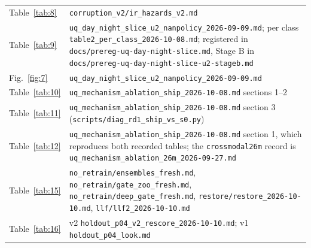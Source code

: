 \documentclass[journal,onecolumn]{IEEEtran}
\begin{document}
\begin{table}[htbp]
\begin{tabularx}{\linewidth}{l>{\raggedright\arraybackslash}X}
Table~\ref{tab:8} & \texttt{corruption\_\allowbreak{}v2/\allowbreak{}ir\_\allowbreak{}hazards\_\allowbreak{}v2.md} \\
Table~\ref{tab:9} & \texttt{uq\_\allowbreak{}day\_\allowbreak{}night\_\allowbreak{}slice\_\allowbreak{}u2\_\allowbreak{}nanpolicy\_\allowbreak{}2026-\allowbreak{}09-\allowbreak{}09.md}; per class \texttt{table2\_\allowbreak{}per\_\allowbreak{}class\_\allowbreak{}2026-\allowbreak{}10-\allowbreak{}08.md}; registered in \texttt{docs/\allowbreak{}prereg-\allowbreak{}uq-\allowbreak{}day-\allowbreak{}night-\allowbreak{}slice.md}, Stage B in \texttt{docs/\allowbreak{}prereg-\allowbreak{}uq-\allowbreak{}day-\allowbreak{}night-\allowbreak{}slice-\allowbreak{}u2-\allowbreak{}stageb.md} \\
Fig.~\ref{fig:7} & \texttt{uq\_\allowbreak{}day\_\allowbreak{}night\_\allowbreak{}slice\_\allowbreak{}u2\_\allowbreak{}nanpolicy\_\allowbreak{}2026-\allowbreak{}09-\allowbreak{}09.md} \\
Table~\ref{tab:10} & \texttt{uq\_\allowbreak{}mechanism\_\allowbreak{}ablation\_\allowbreak{}ship\_\allowbreak{}2026-\allowbreak{}10-\allowbreak{}08.md} sections 1--2 \\
Table~\ref{tab:11} & \texttt{uq\_\allowbreak{}mechanism\_\allowbreak{}ablation\_\allowbreak{}ship\_\allowbreak{}2026-\allowbreak{}10-\allowbreak{}08.md} section 3 (\texttt{scripts/\allowbreak{}diag\_\allowbreak{}rd1\_\allowbreak{}ship\_\allowbreak{}vs\_\allowbreak{}s0.py}) \\
Table~\ref{tab:12} & \texttt{uq\_\allowbreak{}mechanism\_\allowbreak{}ablation\_\allowbreak{}ship\_\allowbreak{}2026-\allowbreak{}10-\allowbreak{}08.md} section 1, which reproduces both recorded tables; the \texttt{crossmodal26m} record is \texttt{uq\_\allowbreak{}mechanism\_\allowbreak{}ablation\_\allowbreak{}26m\_\allowbreak{}2026-\allowbreak{}09-\allowbreak{}27.md} \\
Table~\ref{tab:15} & \texttt{no\_\allowbreak{}retrain/\allowbreak{}ensembles\_\allowbreak{}fresh.md}, \texttt{no\_\allowbreak{}retrain/\allowbreak{}gate\_\allowbreak{}zoo\_\allowbreak{}fresh.md}, \texttt{no\_\allowbreak{}retrain/\allowbreak{}deep\_\allowbreak{}gate\_\allowbreak{}fresh.md}, \texttt{restore/\allowbreak{}restore\_\allowbreak{}2026-\allowbreak{}10-\allowbreak{}10.md}, \texttt{llf/\allowbreak{}llf2\_\allowbreak{}2026-\allowbreak{}10-\allowbreak{}10.md} \\
Table~\ref{tab:16} & v2 \texttt{holdout\_\allowbreak{}p04\_\allowbreak{}v2\_\allowbreak{}rescore\_\allowbreak{}2026-\allowbreak{}10-\allowbreak{}10.md}; v1 \texttt{holdout\_\allowbreak{}p04\_\allowbreak{}look.md} \\

\end{tabularx}
\end{table}
\end{document}
